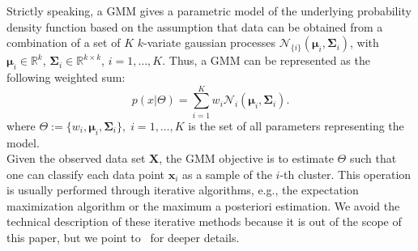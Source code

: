 Strictly speaking, a GMM gives a parametric model of the underlying probability density function based on the assumption that data can be obtained from a combination of a set of $K$ $k$-variate gaussian processes $\mathcal{N}_{\{i\}}(\mathbf{\mu}_i,\mathbf{\Sigma}_i)$, with $\mathbf{\mu}_i \in \mathbb{R}^k$, $\mathbf{\Sigma}_i \in \mathbb{R}^{k \times k}$, $i = 1, \dots , K$.
Thus, a GMM can be represented as the following weighted sum:
\begin{equation}
    \label{eqn: gmm}
    p(x | \Theta)=\sum_{i=1}^{K} w_i\mathcal{N}_i(\mathbf{\mu}_i,\mathbf{\Sigma}_i).
\end{equation}
where $\Theta := \{w_i, \mathbf{\mu}_i, \mathbf{\Sigma}_i\},\; i=1,\dots, K$ is the set of all parameters representing the model.\\
\indent Given the observed data set $\mathbf{X}$, the GMM objective is to estimate $\Theta$ such that one can classify each data point $\mathbf{x}_i$ as a sample of the $i$-th cluster. This operation is usually performed through iterative algorithms, e.g., the expectation maximization algorithm or the maximum a posteriori estimation. We avoid the technical description of these iterative methods because it is out of the scope of this paper, but we point to~\cite{brunton2019data} for deeper details. 

